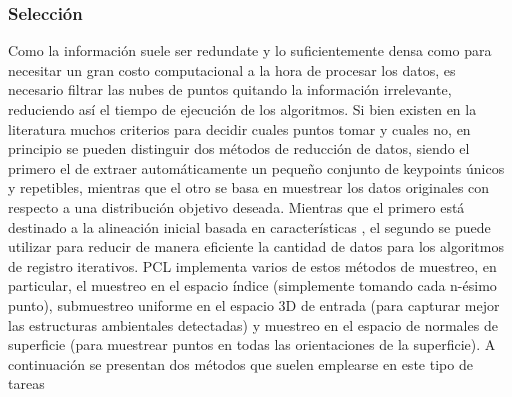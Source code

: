 \subsubsection{Selección}
Como la información suele ser redundate y lo suficientemente densa como para necesitar un gran costo computacional a la hora de procesar los datos, es necesario filtrar las nubes de puntos quitando la información irrelevante, reduciendo así el tiempo de ejecución de los algoritmos. Si bien existen en la literatura muchos criterios para decidir cuales puntos tomar y cuales no, en principio se pueden distinguir dos métodos de reducción de datos, siendo el primero el de extraer automáticamente un pequeño conjunto de keypoints únicos y repetibles, mientras que el otro se basa en muestrear los datos originales con respecto a una distribución objetivo deseada. Mientras que el primero está destinado a la alineación inicial basada en características \cite{merino2016}, el segundo se puede utilizar para reducir de manera eficiente la cantidad de datos para los algoritmos de registro iterativos. PCL implementa varios de estos métodos de muestreo, en particular, el muestreo en el espacio índice (simplemente tomando cada n-ésimo punto), submuestreo uniforme en el espacio 3D de entrada (para capturar mejor las estructuras ambientales detectadas) y muestreo en el espacio de normales de superficie (para muestrear puntos en todas las orientaciones de la superficie). A continuación se presentan dos métodos que suelen emplearse en este tipo de tareas
